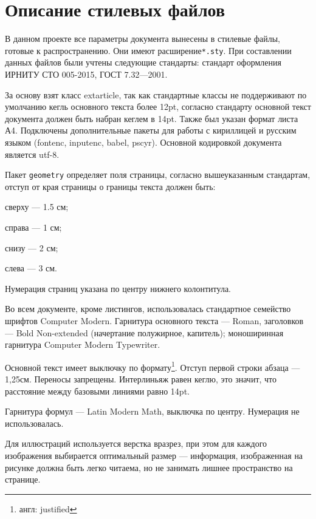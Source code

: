 \section{Описание стилевых файлов}
\label{sec:style}

В данном проекте все параметры документа вынесены в стилевые файлы, готовые к распространению\cite{packages}. Они имеют расширение\texttt{*.sty}. При составлении данных файлов были учтены следующие стандарты: стандарт оформления ИРНИТУ СТО 005-2015\cite{sto005}, ГОСТ 7.32---2001\cite{GOST732}.

За основу взят класс extarticle, так как стандартные классы не поддерживают по умолчанию кегль основного текста более 12pt, согласно стандарту основной текст документа должен быть набран кеглем в 14pt. Также был указан формат листа А4. Подключены дополнительные пакеты для работы с кириллицей и русским языком (fontenc, inputenc, babel, pscyr). Основной кодировкой документа является utf-8.

Пакет \texttt{geometry} определяет поля страницы, согласно вышеуказанным стандартам, отступ от края страницы о границы текста должен быть:
\begin{itemize*}
	\item сверху --- 1.5 см;
	\item справа --- 1 см;
	\item снизу --- 2 см;
	\item слева --- 3 см.
\end{itemize*}

Нумерация страниц указана по центру нижнего колонтитула.

Во всем документе, кроме листингов, использовалась стандартное семейство шрифтов Computer Modern. Гарнитура основного текста --- Roman, заголовков --- Bold Non-extended (начертание полужирное, капитель); моноширинная гарнитура Computer Modern Typewriter.

Основной текст имеет выключку по формату\footnote{англ: justified}. Отступ первой строки абзаца --- 1,25см. Переносы запрещены. Интерлиньяж равен кеглю, это значит, что расстояние между базовыми линиями равно 14pt.

Гарнитура формул --- Latin Modern Math, выключка по центру. Нумерация не использовалась.

Для иллюстраций используется верстка вразрез, при этом для каждого изображения выбирается оптимальный размер --- информация, изображенная на рисунке должна быть легко читаема, но не занимать лишнее пространство на странице.

